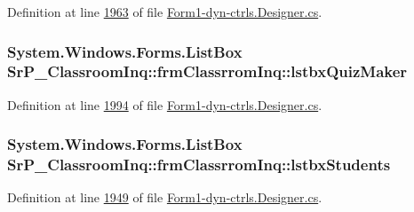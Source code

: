\-Definition at line \hyperlink{_form1-dyn-ctrls_8_designer_8cs_source_l01963}{1963} of file \hyperlink{_form1-dyn-ctrls_8_designer_8cs_source}{\-Form1-\/dyn-\/ctrls.\-Designer.\-cs}.

\hypertarget{class_sr_p___classroom_inq_1_1frm_classrrom_inq_af2496f0a0579263d9def95bd23d29c89}{
\subsubsection[{lstbx\-Quiz\-Maker}]{\setlength{\rightskip}{0pt plus 5cm}\-System.\-Windows.\-Forms.\-List\-Box {\bf \-Sr\-P\-\_\-\-Classroom\-Inq\-::frm\-Classrrom\-Inq\-::lstbx\-Quiz\-Maker}}}
\label{class_sr_p___classroom_inq_1_1frm_classrrom_inq_af2496f0a0579263d9def95bd23d29c89}


\-Definition at line \hyperlink{_form1-dyn-ctrls_8_designer_8cs_source_l01994}{1994} of file \hyperlink{_form1-dyn-ctrls_8_designer_8cs_source}{\-Form1-\/dyn-\/ctrls.\-Designer.\-cs}.

\hypertarget{class_sr_p___classroom_inq_1_1frm_classrrom_inq_a0c67f5e900e579981b753ac9853a5141}{
\subsubsection[{lstbx\-Students}]{\setlength{\rightskip}{0pt plus 5cm}\-System.\-Windows.\-Forms.\-List\-Box {\bf \-Sr\-P\-\_\-\-Classroom\-Inq\-::frm\-Classrrom\-Inq\-::lstbx\-Students}}}
\label{class_sr_p___classroom_inq_1_1frm_classrrom_inq_a0c67f5e900e579981b753ac9853a5141}


\-Definition at line \hyperlink{_form1-dyn-ctrls_8_designer_8cs_source_l01949}{1949} of file \hyperlink{_form1-dyn-ctrls_8_designer_8cs_source}{\-Form1-\/dyn-\/ctrls.\-Designer.\-cs}.

